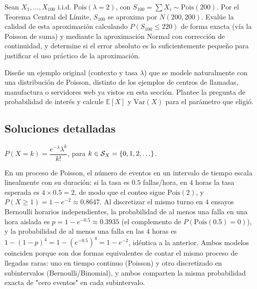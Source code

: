 \begin{problema}
	\label{prob:5e9408a}
	Sean $X_1,\dots,X_{100}$ i.i.d. $\text{Pois}(\lambda=2)$, con $S_{100}=\sum X_i \sim \text{Pois}(200)$. Por el Teorema Central del Límite, $S_{100}$ se aproxima por $N(200,200)$. Evalúe la calidad de esta aproximación calculando $P(S_{100}\le220)$ de forma exacta (vía la Poisson de suma) y mediante la aproximación Normal con corrección de continuidad, y determine si el error absoluto es lo suficientemente pequeño para justificar el uso práctico de la aproximación.
\end{problema}

\begin{problema}
	\label{prob:9dc367e}
	Diseñe un ejemplo original (contexto y tasa $\lambda$) que se modele naturalmente con una distribución de Poisson, distinto de los ejemplos de centros de llamadas, manufactura o servidores web ya vistos en esta sección. Plantee la pregunta de probabilidad de interés y calcule $\mathbb{E}[X]$ y $\text{Var}(X)$ para el parámetro que eligió.
\end{problema}

\subsection*{Soluciones detalladas}

\begin{solproblema}[prob:06f83cc]
	$P(X=k) = \dfrac{e^{-\lambda}\lambda^k}{k!}$, para $k \in \mathcal{S}_X = \set{0,1,2,\dots}$.
\end{solproblema}

\begin{solproblema}
	En un proceso de Poisson, el número de eventos en un intervalo de tiempo escala linealmente con su duración: si la tasa es $0.5$ fallas/hora, en $4$ horas la tasa esperada es $4\times0.5=2$, de modo que el conteo sigue $\text{Pois}(2)$, y $P(X\ge1)=1-e^{-2}\approx0.8647$. Al discretizar el mismo turno en $4$ ensayos Bernoulli horarios independientes, la probabilidad de al menos una falla en una hora aislada es $p=1-e^{-0.5}\approx0.3935$ (el complemento de $P(\text{Pois}(0.5)=0)$), y la probabilidad de al menos una falla en las $4$ horas es $1-(1-p)^4 = 1-(e^{-0.5})^4 = 1-e^{-2}$, idéntica a la anterior. Ambos modelos coinciden porque son dos formas equivalentes de contar el mismo proceso de llegadas raras: uno en tiempo continuo (Poisson) y otro discretizado en subintervalos (Bernoulli/Binomial), y ambos comparten la misma probabilidad exacta de "cero eventos" en cada subintervalo.
\end{solproblema}

